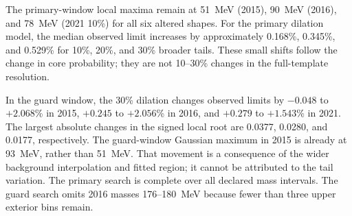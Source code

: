 The primary-window local maxima remain at 51~MeV (2015), 90~MeV (2016), and 78~MeV (2021 10\%) for all six altered shapes. For the primary dilation model, the median observed limit increases by approximately 0.168\%, 0.345\%, and 0.529\% for 10\%, 20\%, and 30\% broader tails. These small shifts follow the change in core probability; they are not 10--30\% changes in the full-template resolution.

In the guard window, the 30\% dilation changes observed limits by $-0.048$ to $+2.068$\% in 2015, $+0.245$ to $+2.056$\% in 2016, and $+0.279$ to $+1.543$\% in 2021. The largest absolute changes in the signed local root are 0.0377, 0.0280, and 0.0177, respectively. The guard-window Gaussian maximum in 2015 is already at 93~MeV, rather than 51~MeV. That movement is a consequence of the wider background interpolation and fitted region; it cannot be attributed to the tail variation. The primary search is complete over all declared mass intervals. The guard search omits 2016 masses 176--180~MeV because fewer than three upper exterior bins remain.
